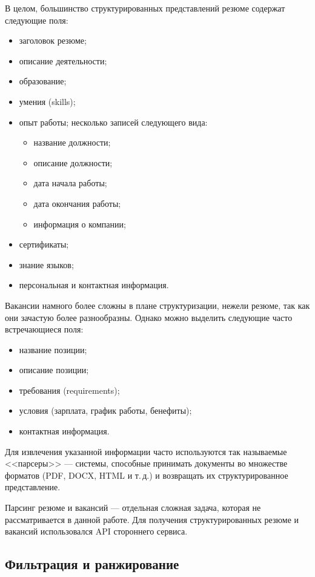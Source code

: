 \documentclass[14pt]{mmcs_article}
\begin{document}
В целом, большинство структурированных представлений резюме содержат следующие поля:

\begin{itemize}
  \item заголовок резюме;
  \item описание деятельности;
  \item образование;
  \item умения (skills);
  \item опыт работы; несколько записей следующего вида:
        \begin{itemize}
          \item название должности;
          \item описание должности;
          \item дата начала работы;
          \item дата окончания работы;
          \item информация о компании;
        \end{itemize}
  \item сертификаты;
  \item знание языков;
  \item персональная и контактная информация.
\end{itemize}

Вакансии намного более сложны в плане структуризации, нежели резюме, так как они зачастую более разнообразны. Однако можно выделить следующие часто встречающиеся поля:

\begin{itemize}
  \item название позиции;
  \item описание позиции;
  \item требования (requirements);
  \item условия (зарплата, график работы, бенефиты);
  \item контактная информация.
\end{itemize}

Для извлечения указанной информации часто используются так называемые <<парсеры>> --- системы, способные принимать документы во множестве форматов (PDF, DOCX, HTML и т.\,д.) и возвращать их структурированное представление.

Парсинг резюме и вакансий --- отдельная сложная задача, которая не рассматривается в данной работе. Для получения структурированных резюме и вакансий использовался API стороннего сервиса.

\subsection*{Фильтрация и ранжирование}\label{filtering_and_ranking}
\end{document}
